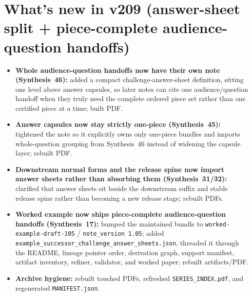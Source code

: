\documentclass[11pt]{article}
\begin{document}
\section{What's new in v209 (answer-sheet split + piece-complete audience-question handoffs)}
\begin{itemize}[leftmargin=*]
\item \textbf{Whole audience-question handoffs now have their own note (Synthesis~46):} added a compact challenge-answer-sheet definition, sitting one level above answer capsules, so later notes can cite one audience/question handoff when they truly need the complete ordered piece set rather than one certified piece at a time; built PDF.
\item \textbf{Answer capsules now stay strictly one-piece (Synthesis~45):} tightened the note so it explicitly owns only one-piece bundles and imports whole-question grouping from Synthesis~46 instead of widening the capsule layer; rebuilt PDF.
\item \textbf{Downstream normal forms and the release spine now import answer sheets rather than absorbing them (Synthesis~31/32):} clarified that answer sheets sit beside the downstream suffix and stable release spine rather than becoming a new release stage; rebuilt PDFs.
\item \textbf{Worked example now ships piece-complete audience-question handoffs (Synthesis~17):} bumped the maintained bundle to \texttt{worked-example-draft-105} / \texttt{note\_version 1.05}; added \texttt{example\_successor\_challenge\_answer\_sheets.json}, threaded it through the README, lineage pointer order, derivation graph, support manifest, artifact inventory, refiner, validator, and worked paper; rebuilt artifacts/PDF.
\item \textbf{Archive hygiene:} rebuilt touched PDFs, refreshed \texttt{SERIES\_INDEX.pdf}, and regenerated \texttt{MANIFEST.json}.
\end{itemize}
\end{document}
